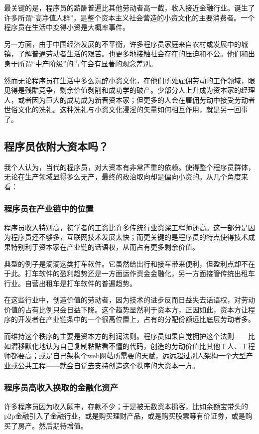 \documentclass[punct=kaiming, zihao=5, openany, fontset=sikou]{ctexbook}
\begin{document}
最关键的是，程序员的薪酬普遍比其他劳动者高一截，收入接近金融行业。诞生了许多所谓“高净值人群”，是整个资本主义社会营造的小资文化的主要消费者。一个程序员在生活中变得小资是大概率事件。

另一方面，由于中国经济发展的不平衡，许多程序员家庭来自农村或发展中的城镇，了解普通劳动者生活的艰苦。也更多地接触社会存在的压迫和不公。他们和出身于所谓“中产阶级”的青年会有显著的观念差别。

然而无论程序员在生活中多么沉醉小资文化，在他们所处雇佣劳动的工作领域，眼见得是残酷竞争，剩余价值剥削和成功学的破产。少部分人上升成为资本家的经理人，或者因为巨大的成功成为新晋资本家；但更多的人会在雇佣劳动中接受劳动者世俗文化的洗礼。这种洗礼与小资文化浸淫的矢量如何相互作用，就是另一回事了。

\subsection{程序员依附大资本吗？}
我个人认为，当代的程序员，对大资本有非常严重的依赖。使得整个程序员群体，无论在生产领域显得多么无产，最终的政治取向却是偏向小资的。从几个角度来看：

\subsubsection{程序员在产业链中的位置}
程序员收入特别高，初学者的工资比许多传统行业资深工程师还高。这一部分是因为程序员还不够多，互联网技术发展太快；而更关键的是程序员的特点使得技术成果特别利于资本家在产业链的话语权，从而占有更多剩余价值。

典型的例子是滴滴这类打车软件。它虽然给出行和接车带来便利，但盈利点却不在于此。打车软件的盈利趋势还是一方面运作资金金融化，另一方面接管传统出租车行业。自营出租车是打车软件的普遍趋势。

在这些行业中，创造价值的劳动者，因为技术的进步反而日益失去话语权，对劳动价值的占有比例只会日益下降。这个趋势显然利于资本方，正因如此，资本方让程序的开发者在产业链条中的一个很高位置上，占有的分配份额远比底层劳动者多。

而维持这个秩序的主要是资本方的利润法则。程序员如果自觉拥护这个法则——比如潜移默化地认为自己复制粘贴看不懂的代码，创造的劳动价值比其他工人、工程师都要高；或是自己架构个web网站所需要的天赋，远远超过别人架构一个大型产业或公共工程——就会自觉去支持创造这个秩序的大资本一方。

\subsubsection{程序员高收入换取的金融化资产}
许多程序员因为收入颇丰，存款不少；于是被无数资本掮客，比如余额宝带头的p2p金融引入了金融行业，或是购买理财产品，或是购买股票等有价证券，或是购买了房产。然后期待增值。
\end{document}
